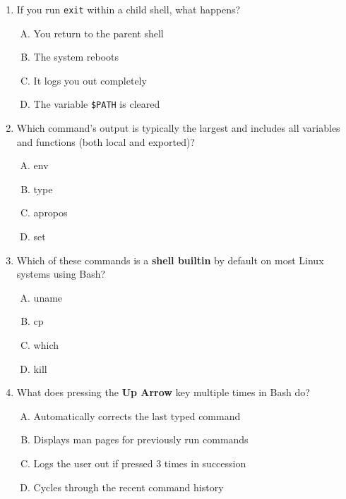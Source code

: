 \documentclass[a4paper]{report}
\begin{document}
\begin{enumerate}[1.]
    \item If you run \texttt{exit} within a child shell, what happens?  
    \begin{enumerate}[A)]
        \item You return to the parent shell  
        \item The system reboots  
        \item It logs you out completely  
        \item The variable \texttt{\$PATH} is cleared  
    \end{enumerate}

    \item Which command’s output is typically the largest and includes all variables and functions (both local and exported)?  
    \begin{enumerate}[A)]
        \item env  
        \item type  
        \item apropos  
        \item set  
    \end{enumerate}

    \item Which of these commands is a \textbf{shell builtin} by default on most Linux systems using Bash?  
    \begin{enumerate}[A)]
        \item uname  
        \item cp  
        \item which  
        \item kill  
    \end{enumerate}

    \item What does pressing the \textbf{Up Arrow} key multiple times in Bash do?  
    \begin{enumerate}[A)]
        \item Automatically corrects the last typed command  
        \item Displays man pages for previously run commands  
        \item Logs the user out if pressed 3 times in succession  
        \item Cycles through the recent command history  
    \end{enumerate}

\end{enumerate}


\end{document}
